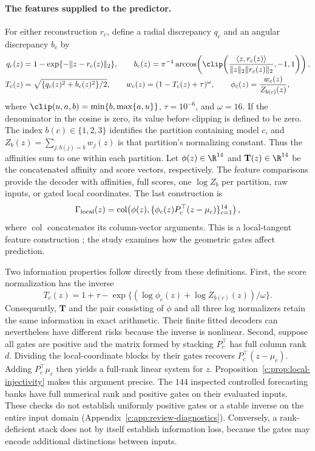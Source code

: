 \paragraph{The features supplied to the predictor.}
For either reconstruction $r_c$, define a radial discrepancy $q_c$ and an
angular discrepancy $b_c$ by
\begin{align}
 q_c(z)&=1-\exp\{-\|z-r_c(z)\|_2\},\qquad
 b_c(z)=\pi^{-1}\arccos\!\left(\clip\!\left(
 \frac{\langle z,r_c(z)\rangle}{\|z\|_2\|r_c(z)\|_2},-1,1\right)\right),
 \nonumber\\[-2pt]
 T_c(z)&=\sqrt{\{q_c(z)^2+b_c(z)^2\}/2},\qquad
 w_c(z)=(1-T_c(z)+\tau)^\omega,\qquad
 \phi_c(z)=\frac{w_c(z)}{Z_{b(c)}(z)},\label{c:eq:phi}
\end{align}
where $\clip(u,a,b)=\min\{b,\max\{a,u\}\}$, $\tau=10^{-6}$, and
$\omega=16$. If the denominator in the cosine is zero, its value before
clipping is defined to be zero. The index $b(c)\in\{1,2,3\}$ identifies
the partition containing model $c$, and
$Z_b(z)=\sum_{j:b(j)=b}w_j(z)$ is that partition's normalizing constant.
Thus the affinities sum to one within each partition. Let
$\phi(z)\in\R^{14}$ and $\mathbf T(z)\in\R^{14}$ be the concatenated
affinity and score vectors, respectively. The feature comparisons provide
the decoder with affinities, full scores, one $\log Z_b$ per partition,
raw inputs, or gated local coordinates. The last construction is
\begin{equation}\label{c:eq:local}
 \Gamma_{\rm local}(z)=
 \operatorname{col}\!\left(
 \phi(z),\{\phi_c(z)P_c^\top(z-\mu_c)\}_{c=1}^{14}\right),
\end{equation}
where $\operatorname{col}$ concatenates its column-vector arguments. This
is a local-tangent feature construction \citep{Yu2010LTC}; the study
examines how the geometric gates affect prediction.

Two information properties follow directly from these definitions. First,
the score normalization has the inverse
\begin{equation}\label{c:eq:inverse}
 T_c(z)=1+\tau-
 \exp\{(\log\phi_c(z)+\log Z_{b(c)}(z))/\omega\}.
\end{equation}
Consequently, $\mathbf T$ and the pair consisting of $\phi$ and all three
log normalizers retain the same information in exact arithmetic. Their
finite fitted decoders can nevertheless have different risks because the
inverse is nonlinear. Second, suppose all gates are positive and the
matrix formed by stacking $P_c^\top$ has full column rank $d$. Dividing
the local-coordinate blocks by their gates recovers $P_c^\top(z-\mu_c)$.
Adding $P_c^\top\mu_c$ then yields a full-rank linear system for $z$.
Proposition~\ref{c:prop:local-injectivity} makes this argument precise.
The $144$ inspected controlled forecasting banks have full numerical rank
and positive gates on their evaluated inputs. These checks do not establish
uniformly positive gates or a stable inverse on the entire input domain
(Appendix~\ref{c:app:review-diagnostics}). Conversely, a rank-deficient
stack does not by itself establish information loss, because the gates
may encode additional distinctions between inputs.

